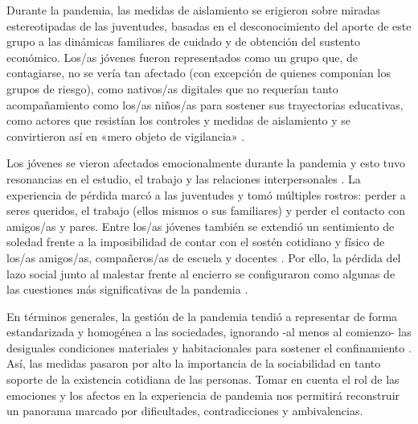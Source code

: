 \begin{refsection}
Durante la pandemia, las medidas de aislamiento se erigieron sobre miradas estereotipadas de las juventudes, basadas en el desconocimiento del aporte de este grupo a las dinámicas familiares de cuidado y de obtención del sustento económico. Los/as jóvenes fueron representados como un grupo que, de contagiarse, no se vería tan afectado (con excepción de quienes componían los grupos de riesgo), como nativos/as digitales que no requerían tanto acompañamiento como los/as niños/as para sostener sus trayectorias educativas, como actores que resistían los controles y medidas de aislamiento y se convirtieron así en «mero objeto de vigilancia» \protect\parencite[pág.~10]{4238-NAVARRO2022}.

Los jóvenes se vieron afectados emocionalmente durante la pandemia y esto tuvo resonancias en el estudio, el trabajo y las relaciones interpersonales \protect\parencite{4238-NAVARRO2022,4251-KAPLAN2021}. La experiencia de pérdida marcó a las juventudes y tomó múltiples rostros: perder a seres queridos, el trabajo (ellos mismos o sus familiares) y perder el contacto con amigos/as y pares. Entre los/as jóvenes también se extendió un sentimiento de soledad frente a la imposibilidad de contar con el sostén cotidiano y físico de los/as amigos/as, compañeros/as de escuela y docentes \protect\parencite{4251-KAPLAN2021}. Por ello, la pérdida del lazo social junto al malestar frente al encierro se configuraron como algunas de las cuestiones más significativas de la pandemia \protect\parencite{4303-DINAPOLI2022}.

En términos generales, la gestión de la pandemia tendió a representar de forma estandarizada y homogénea a las sociedades, ignorando -al menos al comienzo- las desiguales condiciones materiales y habitacionales para sostener el confinamiento \protect\parencite{4241-MARTUCCELLI2021}. Así, las medidas pasaron por alto la importancia de la sociabilidad en tanto soporte de la existencia cotidiana de las personas. Tomar en cuenta el rol de las emociones y los afectos en la experiencia de pandemia nos permitirá reconstruir un panorama marcado por dificultades, contradicciones y ambivalencias.



\end{refsection}
